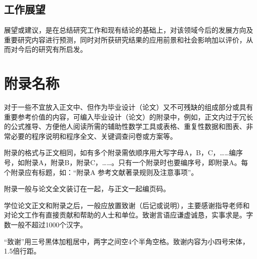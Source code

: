 \documentclass{seuthesis-2022}
\begin{document}
\section{工作展望}
展望或建议，是在总结研究工作和现有结论的基础上，对该领域今后的发展方向及重要研究内容进行预测，同时对所获研究结果的应用前景和社会影响加以评价，从而对今后的研究有所启发。

\nocite{*}



\appendix
\chapter{附录名称}
对于一些不宜放入正文中、但作为毕业设计（论文）又不可残缺的组成部分或具有重要参考价值的内容，可编入毕业设计（论文）的附录中，例如，正文内过于冗长的公式推导、方便他人阅读所需的辅助性数学工具或表格、重复性数据和图表、非常必要的程序说明和程序全文、关键调查问卷或方案等。

附录的格式与正文相同，如有多个附录需依顺序用大写字母A，B，C，……编序号，如附录A，附录B，附录C，……。只有一个附录时也要编序号，即附录A。每个附录应有标题，如：“附录A 参考文献著录规则及注意事项”。

附录一般与论文全文装订在一起，与正文一起编页码。


\begin{acknowledgement}
学位论文正文和附录之后，一般应放置致谢（后记或说明），主要感谢指导老师和对论文工作有直接贡献和帮助的人士和单位。致谢言语应谦虚诚恳，实事求是。字数一般不超过1000个汉字。

“致谢”用三号黑体加粗居中，两字之间空4个半角空格。致谢内容为小四号宋体，1.5倍行距。
\end{acknowledgement}
\end{document}
